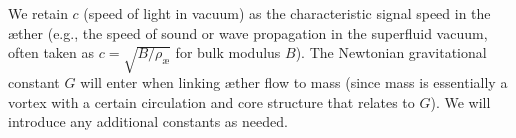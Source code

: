We retain $c$ (speed of light in vacuum) as the characteristic signal speed in the æther (e.g., the speed of sound or wave propagation in the superfluid vacuum, often taken as $c = \sqrt{B/\rho_\text{\ae}}$ for bulk modulus $B$). The Newtonian gravitational constant $G$ will enter when linking æther flow to mass (since mass is essentially a vortex with a certain circulation and core structure that relates to $G$). We will introduce any additional constants as needed.
